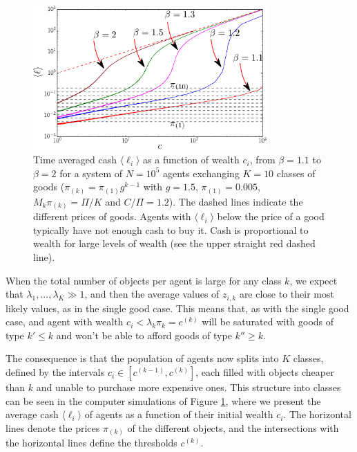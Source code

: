 \begin{figure}
\centering
\includegraphics[width=0.8\textwidth]{figs_ineq/cropping-liquidity_global-crop.pdf}
\caption{Time averaged cash $\langle \ell_i \rangle$ as a function of wealth $c_i$, from $\beta= 1.1$ to $\beta =2$  for a system of $N=10^5$ agents exchanging $K=10$ classes of goods ($\pi_{(k)}=\pi_{(1)}g^{k-1}$ with $g=1.5$, $\pi_{(1)}=0.005$, $M_k\pi_{(k)}=\Pi/K$ and $C/\Pi=1.2$). The dashed lines indicate the different prices of goods. Agents with $\langle \ell_i \rangle$ below the price of a good typically have not enough cash to buy it. Cash is proportional to wealth for large levels of wealth (see the upper straight red dashed line).}
\label{Fig:K10_classes}
\end{figure}


When the total number of objects per agent is large for any class $k$, we expect that $\lambda_1, ..., \lambda_K \gg 1$, and then the average values of $z_{i,k}$ are close to their most likely values, as in the single good case. This means that, as with the single good case, and agent with wealth $c_i < \lambda_k \pi_k = c^{(k)}$ will be saturated with goods of type $k'\leq k$ and won't be able to afford goods of type $k'' \geq k$. 

The consequence is that the population of agents now splits into $K$ classes, defined by the intervals $c_i \in [c^{(k-1)},c^{(k)}]$, each filled with objects cheaper than $k$ and unable to purchase more expensive ones. This structure into classes can be seen in the computer simulations of Figure \ref{Fig:K10_classes}, where we present the average cash $\langle \ell_i \rangle$ of agents as a function of their initial wealth $c_i$. The horizontal lines denote the prices $\pi_{(k)}$ of the different objects, and the intersections with the horizontal lines define the thresholds $c^{(k)}$.


